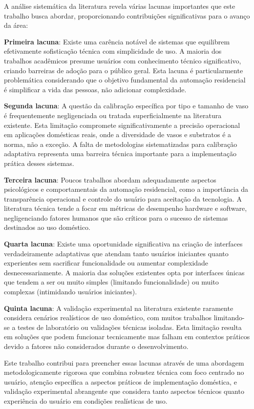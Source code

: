 \documentclass[twoside,english,brazilian]{UNISINOSmonografia}
\begin{document}
A análise sistemática da literatura revela várias lacunas importantes que este trabalho busca abordar, proporcionando contribuições significativas para o avanço da área:

\textbf{Primeira lacuna}: Existe uma carência notável de sistemas que equilibrem efetivamente sofisticação técnica com simplicidade de uso. A maioria dos trabalhos acadêmicos presume usuários com conhecimento técnico significativo, criando barreiras de adoção para o público geral. Esta lacuna é particularmente problemática considerando que o objetivo fundamental da automação residencial é simplificar a vida das pessoas, não adicionar complexidade.

\textbf{Segunda lacuna}: A questão da calibração específica por tipo e tamanho de vaso é frequentemente negligenciada ou tratada superficialmente na literatura existente. Esta limitação compromete significativamente a precisão operacional em aplicações domésticas reais, onde a diversidade de vasos e substratos é a norma, não a exceção. A falta de metodologias sistematizadas para calibração adaptativa representa uma barreira técnica importante para a implementação prática desses sistemas.

\textbf{Terceira lacuna}: Poucos trabalhos abordam adequadamente aspectos psicológicos e comportamentais da automação residencial, como a importância da transparência operacional e controle do usuário para aceitação da tecnologia. A literatura técnica tende a focar em métricas de desempenho hardware e software, negligenciando fatores humanos que são críticos para o sucesso de sistemas destinados ao uso doméstico.

\textbf{Quarta lacuna}: Existe uma oportunidade significativa na criação de interfaces verdadeiramente adaptativas que atendam tanto usuários iniciantes quanto experientes sem sacrificar funcionalidade ou aumentar complexidade desnecessariamente. A maioria das soluções existentes opta por interfaces únicas que tendem a ser ou muito simples (limitando funcionalidade) ou muito complexas (intimidando usuários iniciantes).

\textbf{Quinta lacuna}: A validação experimental na literatura existente raramente considera cenários realísticos de uso doméstico, com muitos trabalhos limitando-se a testes de laboratório ou validações técnicas isoladas. Esta limitação resulta em soluções que podem funcionar tecnicamente mas falham em contextos práticos devido a fatores não considerados durante o desenvolvimento.

Este trabalho contribui para preencher essas lacunas através de uma abordagem metodologicamente rigorosa que combina robustez técnica com foco centrado no usuário, atenção específica a aspectos práticos de implementação doméstica, e validação experimental abrangente que considera tanto aspectos técnicos quanto experiência do usuário em condições realísticas de uso.
\end{document}
